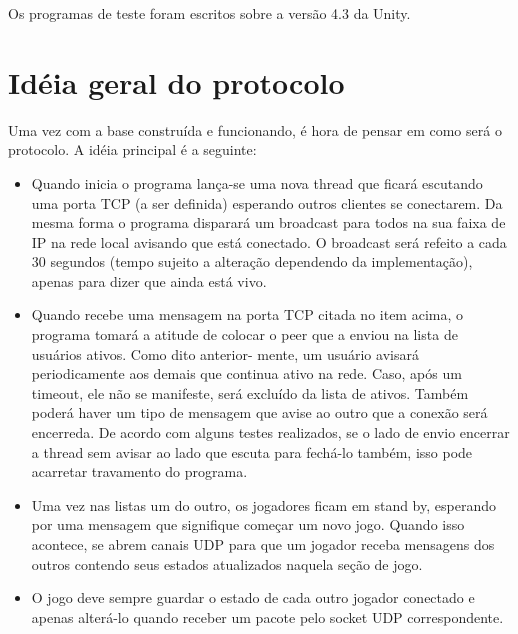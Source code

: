 \documentclass{article}
\begin{document}
Os programas de teste foram escritos sobre a versão 4.3 da Unity.

\section{Idéia geral do protocolo}
Uma vez com a base construída e funcionando, é hora de pensar em como será o protocolo.
A idéia principal é a seguinte:
\\
\begin{itemize}
\item Quando inicia o programa lança-se uma nova thread que ficará escutando uma porta
TCP (a ser definida) esperando outros clientes se conectarem. Da mesma forma o programa
disparará um broadcast para todos na sua faixa de IP na rede local avisando que está
conectado. O broadcast será refeito a cada 30 segundos (tempo sujeito a alteração
dependendo da implementação), apenas para dizer que ainda está vivo.
\item Quando recebe uma mensagem na porta TCP citada no item acima, o programa tomará
a atitude de colocar o peer que a enviou na lista de usuários ativos. Como
dito anterior-
mente, um usuário avisará periodicamente aos demais que continua ativo na rede. Caso, 
após um timeout, ele não se manifeste, será excluído da lista de ativos. Também poderá
haver um tipo de mensagem que avise ao outro que a conexão será encerreda. De acordo com
alguns testes realizados, se o lado de envio encerrar a thread sem avisar ao lado que
escuta para fechá-lo também, isso pode acarretar travamento do programa.
\item Uma vez nas listas um do outro, os jogadores ficam em stand by, esperando por
uma mensagem que signifique começar um novo jogo. Quando isso acontece, se abrem canais
UDP para que um jogador receba mensagens dos outros contendo seus estados atualizados
naquela seção de jogo.
\item O jogo deve sempre guardar o estado de cada outro jogador conectado e apenas
alterá-lo quando receber um pacote pelo socket UDP correspondente.
\end{itemize}
\end{document}
